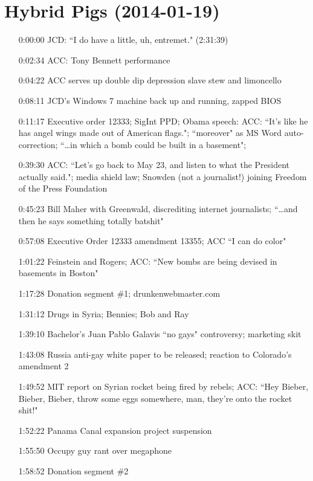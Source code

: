 \documentclass{report}
\newcommand{\mono}[1]{{\fontspec{Courier}#1}}
\begin{document}
\setcounter{section}{584}\section[Hybrid Pigs]{Hybrid Pigs \small{(2014-01-19)}}
\begin{itemize}
\item[\mono{0:00:00}] JCD: ``I do have a little, uh, entremet." (2:31:39)
\item[\mono{0:02:34}] ACC: Tony Bennett performance
\item[\mono{0:04:22}] ACC serves up double dip depression slave stew and limoncello
\item[\mono{0:08:11}] JCD's Windows 7 machine back up and running, zapped BIOS
\item[\mono{0:11:17}] Executive order 12333; SigInt PPD; Obama speech: ACC: ``It's like he has angel wings made out of American flags."; ``moreover" as MS Word auto-correction; ``…in which a bomb could be built in a basement";
\item[\mono{0:39:30}] ACC: ``Let's go back to May 23, and listen to what the President actually said."; media shield law; Snowden (not a journalist!) joining Freedom of the Press Foundation
\item[\mono{0:45:23}] Bill Maher with Greenwald, discrediting internet journalists; ``…and then he says something totally batshit"
\item[\mono{0:57:08}] Executive Order 12333 amendment 13355; ACC ``I can do color"
\item[\mono{1:01:22}] Feinstein and Rogers; ACC: ``New bombs are being devised in basements in Boston"
\item[\mono{1:17:28}] Donation segment \#1; drunkenwebmaster.com
\item[\mono{1:31:12}] Drugs in Syria; Bennies; Bob and Ray
\item[\mono{1:39:10}] Bachelor's Juan Pablo Galavis ``no gays" controversy; marketing skit
\item[\mono{1:43:08}] Russia anti-gay white paper to be released; reaction to Colorado's amendment 2
\item[\mono{1:49:52}] MIT report on Syrian rocket being fired by rebels; ACC: ``Hey Bieber, Bieber, Bieber, throw some eggs somewhere, man, they're onto the rocket shit!"
\item[\mono{1:52:22}] Panama Canal expansion project suspension
\item[\mono{1:55:50}] Occupy guy rant over megaphone
\item[\mono{1:58:52}] Donation segment \#2

\end{itemize}
\end{document}
